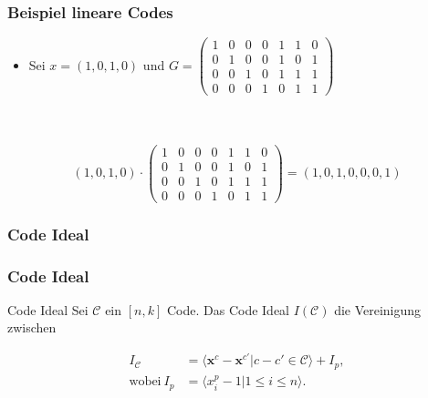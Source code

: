 \documentclass{beamer}
\begin{document}
\begin{frame}[fragile]
\frametitle{Beispiel lineare Codes}

\begin{itemize}
\item   Sei $x = \left(1,0,1,0\right)$ und $
 G =
 \begin{pmatrix}
 1 & 0 & 0 & 0 & 1 & 1 & 0 \\ 
 0 & 1 & 0 & 0 & 1 & 0 & 1 \\  
 0 & 0 & 1 & 0 & 1 & 1 & 1 \\ 
 0 & 0 & 0 & 1 & 0 & 1 & 1
 \end{pmatrix} 
 $
\end{itemize}

 ~\\
 ~\\
 \[
      \left(1,0,1,0\right) \cdot \begin{pmatrix}
      1 & 0 & 0 & 0 & 1 & 1 & 0 \\ 
      0 & 1 & 0 & 0 & 1 & 0 & 1 \\  
      0 & 0 & 1 & 0 & 1 & 1 & 1 \\ 
      0 & 0 & 0 & 1 & 0 & 1 & 1
      \end{pmatrix}   = \left(1,0,1,0,0,0,1\right) 
  \]




\end{frame}


\frametitle{Code Ideal}
\begin{frame}
\frametitle{Code Ideal}

\begin{block}{Code Ideal}
Sei $\mathcal{C}$ ein $[n,k]$ Code. Das Code Ideal $I(\mathcal{C})$ die Vereinigung zwischen

\begin{align*}
 I_{\mathcal{C}} & = \langle \textbf{x}^{c} - \textbf{x}^{c'} | c - c' \in \mathcal{C}  \rangle + I_{p},\\
\textrm{wobei} ~ I_{p} & = \langle x_{i}^{p} - 1 | 1 \leq i \leq n \rangle .
\end{align*}


\end{block}



\end{frame}


\end{document}
